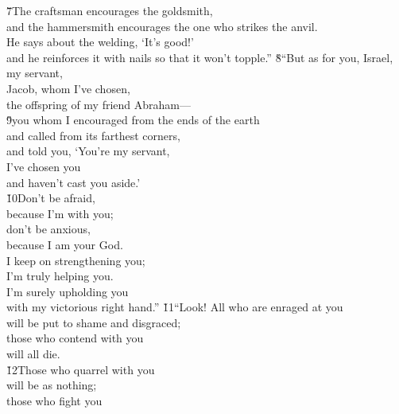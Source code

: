 \begin{poetry}
\poeml \v{7}The craftsman encourages the goldsmith, \\
\poemll    and the hammersmith encourages the one who strikes the anvil. \\
\poeml He says about the welding, `It's good!' \\
\poemll    and he reinforces it with nails so that it won't topple.''
\poeml \v{8}``But as for you, Israel, my servant, \\
\poemll    Jacob, whom I've chosen, \\
\poemlll       the offspring of my friend Abraham--- \\
\poeml \v{9}you whom I encouraged from the ends of the earth \\
\poemll    and called from its farthest corners, \\
\poeml and told you, `You're my servant, \\
\poemll    I've chosen you \\
\poemlll       and haven't cast you aside.' \\
\poeml \v{10}Don't be afraid, \\
\poemll    because I'm with you; \\
\poeml don't be anxious, \\
\poemll    because I am your God. \\
\poeml I keep on strengthening you; \\
\poemll    I'm truly helping you. \\
\poeml I'm surely upholding you \\
\poemll    with my victorious right hand.''
\poeml \v{11}``Look! All who are enraged at you \\
\poemll    will be put to shame and disgraced; \\
\poeml those who contend with you \\
\poemll    will all die. \\
\poeml \v{12}Those who quarrel with you \\
\poemll    will be as nothing; \\
\poeml those who fight you \\

\end{poetry}
